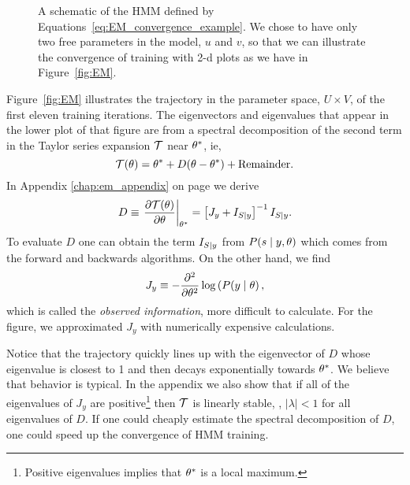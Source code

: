 \begin{figure}[htbp]
  \caption[An HMM with only two parameters.]%
  {A schematic of the HMM defined by
    Equations~\eqref{eq:EM_convergence_example}.  We chose to have only two
    free parameters in the model, $u$ and $v$, so that we can
    illustrate the convergence of training with 2-d plots as we have
    in Figure~\ref{fig:EM}.}
  \label{fig:EMxfig}
\end{figure}
      
Figure~\ref{fig:EM} illustrates the trajectory in the parameter space,
$U \times V$, of the first eleven training iterations.  The
eigenvectors and eigenvalues that appear in the lower plot of that
figure are from a spectral decomposition of the second term in the
Taylor series expansion $\EMmap$ near ${\theta^*}$, ie,
\begin{equation*}
  \EMmap(\parameters) = \EMfixedPoint + D  (\parameters - \EMfixedPoint) +
             \text{Remainder.}
\end{equation*}
In Appendix \ref{chap:em_appendix} on page
\pageref{eq:information_em_derivative} we derive
\begin{equation*}
  D \equiv \left.\frac{\partial \EMmap(\parameters)}{\partial \parameters}
  \right|_\EMfixedPoint = \left[J_y + I_{S|y}  \right]^{-1} I_{S|y}.
\end{equation*}
To evaluate $D$ one can obtain the term $I_{S\mid y}$ from
$P(s\mid y, \theta)$ which comes from the forward and backwards
algorithms.  On the other hand, we find
\begin{equation*}
  J_y \equiv -\frac{\partial^2}{\partial \theta^2} \log \left( P(y \mid
    \theta \right),
\end{equation*}
which is called the \emph{observed information}, more difficult to
calculate.  For the figure, we approximated $J_y$ with numerically
expensive calculations.

Notice that the trajectory quickly lines up with the eigenvector of
$D$ whose eigenvalue is closest to 1 and then decays exponentially
towards ${\theta^*}$.  We believe that behavior is typical.  In the
appendix we also show that if all of the eigenvalues of $J_y$ are
positive\footnote{Positive eigenvalues implies that ${\theta^*}$ is
  a local maximum.} then $\EMmap$ is linearly stable, \ie,
$\left| \lambda \right| < 1$ for all eigenvalues of $D$.  If one could
cheaply estimate the spectral decomposition of $D$, one could speed up
the convergence of HMM training.

